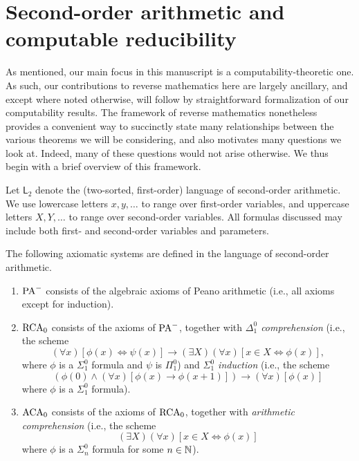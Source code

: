 \section{Second-order arithmetic and computable reducibility}\label{sec:bkg_rm}

As mentioned, our main focus in this manuscript is a computability-theoretic one. As such, our contributions to reverse mathematics here are largely ancillary, and except where noted otherwise, will follow by straightforward formalization of our computability results. The framework of reverse mathematics nonetheless provides a convenient way to succinctly state many relationships between the various theorems we will be considering, and also motivates many questions we look at. Indeed, many of these questions would not arise otherwise. We thus begin with a brief overview of this framework.

Let $\mathsf{L}_2$ denote the (two-sorted, first-order) language of second-order arithmetic. We use lowercase letters $x,y,\ldots$ to range over first-order variables, and uppercase letters $X,Y,\ldots$ to range over second-order variables. All formulas discussed may include both first- and second-order variables and parameters.

\begin{definition}\label{def:subsystems}
	The following axiomatic systems are defined in the language of second-order arithmetic.
	\begin{enumerate}
		\item $\mathrm{PA}^-$ consists of the algebraic axioms of Peano arithmetic (i.e., all axioms except for induction).
		\item $\mathrm{RCA}_0$ consists of the axioms of $\mathrm{PA}^-$, together with \emph{$\Delta^0_1$ comprehension} (i.e., the scheme
		\[
			(\forall x)[\phi(x) \iff \psi(x)] \to (\exists X)(\forall x)[x \in X \iff \phi(x)],
		\]
		where $\phi$ is a $\Sigma^0_1$ formula and $\psi$ is $\Pi^0_1$) and \emph{$\Sigma^0_1$ induction} (i.e., the scheme
		\[
			(\phi(0) \wedge (\forall x)[\phi(x) \to \phi(x+1)]) \to (\forall x)[\phi(x)]
		\]
		where $\phi$ is a $\Sigma^0_1$ formula).
		\item $\mathrm{ACA}_0$ consists of the axioms of $\mathrm{RCA}_0$, together with \emph{arithmetic comprehension} (i.e., the scheme
		\[
			(\exists X)(\forall x)[x \in X \iff \phi(x)]
		\]
		where $\phi$ is a $\Sigma^0_n$ formula for some $n \in \mathbb{N}$).
	\end{enumerate}	
\end{definition}

